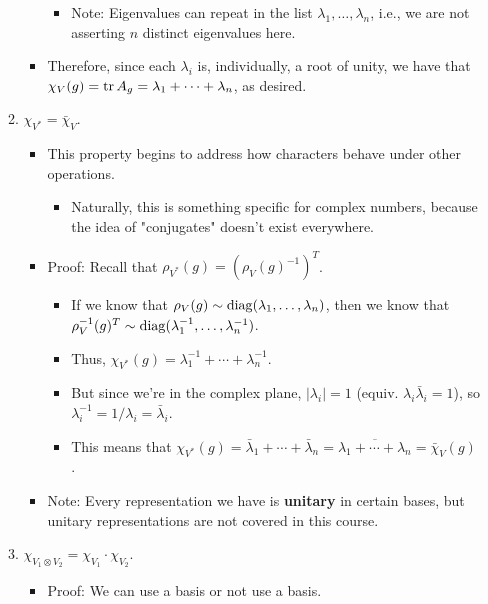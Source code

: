 \documentclass[../notes.tex]{subfiles}
\begin{document}
\begin{itemize}
\begin{enumerate}[resume]
\begin{itemize}
            \begin{itemize}
                \item Note: Eigenvalues can repeat in the list $\lambda_1,\dots,\lambda_n$, i.e., we are not asserting $n$ distinct eigenvalues here.
            \end{itemize}
            \item Therefore, since each $\lambda_i$ is, individually, a root of unity, we have that $\chi_V(g)=\tr A_g=\lambda_1+\cdots+\lambda_n$, as desired.
        \end{itemize}
        \item $\chi_{V^*}=\bar{\chi}_V$.
        \begin{itemize}
            \item This property begins to address how characters behave under other operations.
            \begin{itemize}
                \item Naturally, this is something specific for complex numbers, because the idea of "conjugates" doesn't exist everywhere.
            \end{itemize}
            \item Proof: Recall that $\rho_{V^*}(g)=(\rho_V(g)^{-1})^T$.
            \begin{itemize}
                \item If we know that $\rho_V(g)\sim\operatorname{diag}(\lambda_1,\dots,\lambda_n)$, then we know that $\rho_V^{-1}(g)^T\sim\operatorname{diag}(\lambda_1^{-1},\dots,\lambda_n^{-1})$.
                \item Thus, $\chi_{V^*}(g)=\lambda_1^{-1}+\cdots+\lambda_n^{-1}$.
                \item But since we're in the complex plane, $|\lambda_i|=1$ (equiv. $\lambda_i\bar{\lambda}_i=1$), so $\lambda_i^{-1}=1/\lambda_i=\bar{\lambda}_i$.
                \item This means that $\chi_{V^*}(g)=\bar{\lambda}_1+\cdots+\bar{\lambda}_n=\overline{\lambda_1+\cdots+\lambda_n}=\bar{\chi}_V(g)$.
            \end{itemize}
            \item Note: Every representation we have is \textbf{unitary} in certain bases, but unitary representations are not covered in this course.
        \end{itemize}
        \item $\chi_{V_1\otimes V_2}=\chi_{V_1}\cdot\chi_{V_2}$.
        \begin{itemize}
            \item Proof: We can use a basis or not use a basis.

\end{itemize}
\end{enumerate}
\end{itemize}
\end{document}
